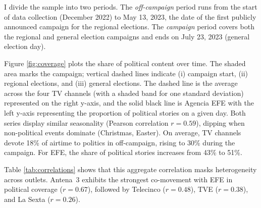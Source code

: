 \documentclass[12pt]{article}
\begin{document}
	
I divide the sample into two periods. The \textit{off-campaign} period runs from the start of data collection (December 2022) to May 13, 2023, the date of the first publicly announced campaign for the regional elections. The \textit{campaign} period covers both the regional and general election campaigns and ends on July 23, 2023 (general election day).

	
	Figure \ref{fig:coverage} plots the share of political content over time. The shaded area marks the campaign; vertical dashed lines indicate (i) campaign start, (ii) regional elections, and (iii) general elections. The dashed line is the average across the four TV channels (with a shaded band for one standard deviation) represented on the right y-axis, and the solid black line is Agencia EFE with the left y-axis representing the proportion of political stories on a given day. Both series display similar seasonality (Pearson correlation $r=0.59$), dipping when non-political events dominate (Christmas, Easter). On average, TV channels devote 18\% of airtime to politics in off-campaign, rising to 30\% during the campaign. For EFE, the share of political stories increases from 43\% to 51\%.
	
	Table \ref{tab:correlations} shows that this aggregate correlation masks heterogeneity across outlets. Antena~3 exhibits the strongest co-movement with EFE in political coverage ($r=0.67$), followed by Telecinco ($r=0.48$), TVE ($r=0.38$), and La Sexta ($r=0.26$).
	
	




	

 
\end{document}
